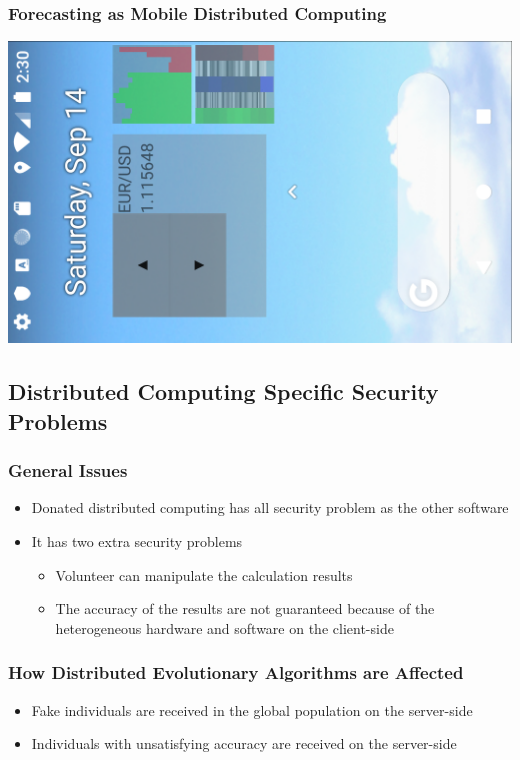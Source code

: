 \documentclass{beamer}
\begin{document}
\begin{frame}
\frametitle{Forecasting as Mobile Distributed Computing}
\includegraphics[scale=0.2]{fig04}
\end{frame}

\subsection{Distributed Computing Specific Security Problems}

\begin{frame}
\frametitle{General Issues}
\begin{itemize}
	\item Donated distributed computing has all security problem as the other software
	\item It has two extra security problems
	\begin{itemize}
		\item Volunteer can manipulate the calculation results
		\item The accuracy of the results are not guaranteed because of the heterogeneous hardware and software on the client-side
	\end{itemize}
\end{itemize}
\end{frame}

\begin{frame}
\frametitle{How Distributed Evolutionary Algorithms are Affected}
\begin{itemize}
	\item Fake individuals are received in the global population on the server-side
	\item Individuals with unsatisfying accuracy are received on the server-side
\end{itemize}
\end{frame}
\end{document}
